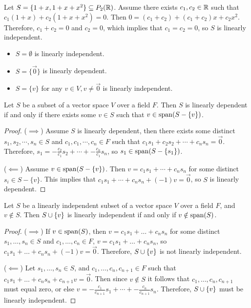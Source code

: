 \begin{exmp}
    Let $S = \{1 + x, 1 + x + x^2\} \subseteq P_2(\mathbb{R})$. Assume there exists $c_1, c_2 \in \mathbb{R}$ such that $c_1(1 + x) + c_2(1 + x + x^2) = 0$. Then $0 = (c_1 + c_2) + (c_1 + c_2)x + c_2x^2$. Therefore, $c_1 + c_2 = 0$ and $c_2 = 0$, which implies that $c_1 = c_2 = 0$, so $S$ is linearly independent.
\end{exmp}

\begin{exmp}\proofbreak
    \begin{itemize}
        \item $S = \emptyset$ is linearly independent.
        \item $S = \{\vec{0}\}$ is linearly dependent.
        \item $S = \{v\}$ for any $v \in V, v \neq \vec{0}$ is linearly independent.
    \end{itemize}
\end{exmp}

\begin{prop}\label{linear-dependence-implies-extra-vector}
    Let $S$ be a subset of a vector space $V$ over a field $F$. Then $S$ is linearly dependent if and only if there exists some $v \in S$ such that $v \in \operatorname{span}(S - \{v\})$.
\end{prop}

\begin{proof}\proofbreak
    ($\implies$) Assume $S$ is linearly dependent, then there exists some distinct $s_1, s_2, \cdots, s_n \in S$ and $c_1, c_1, \cdots, c_n \in F$ such that $c_1s_1 + c_2s_2 + \cdots + c_ns_n = \vec{0}$. Therefore, $s_1 = -\frac{c_2}{c_1}s_2 + \cdots + -\frac{c_n}{c_1}s_n$, so $s_1 \in \operatorname{span}(S - \{s_1\})$.

    ($\impliedby$) Assume $v \in \operatorname{span}(S - \{v\})$. Then $v = c_1s_1 + \cdots + c_ns_n$ for some distinct $s_i \in S - \{v\}$. This implies that $c_1s_1 + \cdots + c_ns_n + (-1)v = \vec{0}$, so $S$ is linearly dependent.
\end{proof}

\begin{prop}\label{linear-independence-with-extra-vector}
    Let $S$ be a linearly independent subset of a vector space $V$ over a field $F$, and $v \notin S$. Then $S \cup \{v\}$ is linearly independent if and only if $v \notin \operatorname{span}(S)$.
\end{prop}

\begin{proof}\proofbreak
    ($\implies$) If $v \in \operatorname{span}(S)$, then $v = c_1s_1 + \ldots + c_ns_n$ for some distinct $s_1, \ldots, s_n \in S$ and $c_1, \ldots, c_n \in F$, $v = c_1s_1 + \ldots + c_ns_n$, so $c_1s_1 + \ldots + c_ns_n + (-1)v = \vec{0}$. Therefore, $S \cup \{v\}$ is not linearly independent.

    ($\impliedby$) Let $s_1, \ldots, s_n \in S$, and $c_1, \ldots, c_n, c_{n+1} \in F$ such that $c_1s_1 + \ldots + c_ns_n + c_{n+1}v = \vec{0}$. Then since $v \notin S$ it follows that $c_1, \ldots, c_n, c_{n+1}$ must equal zero, or else $v = -\frac{c_1}{c_{n+1}}s_1 + \cdots + -\frac{c_n}{c_{n+1}}s_n$. Therefore, $S \cup \{v\}$ must be linearly independent.
\end{proof}

